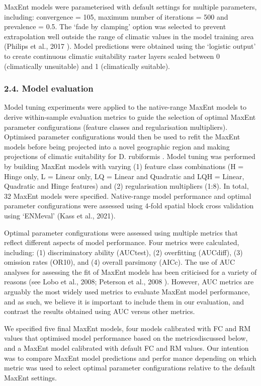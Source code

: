 \documentclass[
  authoryear,
  preprint,
  3p,
  twocolumn]{elsarticle}
\begin{document}
MaxEnt models were parameterised with default settings for multiple
parameters, including: convergence = 105, maximum number of iterations =
500 and prevalence = 0.5. The `fade by clamping' option was selected to
prevent extrapolation well outside the range of climatic values in the
model training area (Philips et al., 2017 ). Model predictions were
obtained using the `logistic output' to create continuous climatic
suitability raster layers scaled between 0 (climatically unsuitable) and
1 (climatically suitable).

\hypertarget{model-evaluation}{%
\subsubsection{2.4. Model evaluation}\label{model-evaluation}}

Model tuning experiments were applied to the native-range MaxEnt models
to derive within-sample evaluation metrics to guide the selection of
optimal MaxEnt parameter configurations (feature classes and
regularisation multipliers). Optimised parameter configurations would
then be used to refit the MaxEnt models before being projected into a
novel geographic region and making projections of climatic suitability
for D. rubiformis . Model tuning was performed by building MaxEnt models
with varying (1) feature class combinations (H = Hinge only, L = Linear
only, LQ = Linear and Quadratic and LQH = Linear, Quadratic and Hinge
features) and (2) regularisation multipliers (1:8). In total, 32 MaxEnt
models were specified. Native-range model performance and optimal
parameter configurations were assessed using 4-fold spatial block cross
validation using `ENMeval' (Kass et al., 2021).

Optimal parameter configurations were assessed using multiple metrics
that reflect different aspects of model performance. Four metrics were
calculated, including: (1) discriminatory ability (AUCtest), (2)
overfitting (AUCdiff), (3) omission rates (OR10), and (4) overall
parsimony (AICc). The use of AUC analyses for assessing the fit of
MaxEnt models has been criticised for a variety of reasons (see Lobo et
al., 2008; Peterson et al., 2008 ). However, AUC metrics are arguably
the most widely used metrics to evaluate MaxEnt model performance, and
as such, we believe it is important to include them in our evaluation,
and contrast the results obtained using AUC versus other metrics.

We specified five final MaxEnt models, four models calibrated with FC
and RM values that optimised model performance based on the
metricsdiscussed below, and a MaxEnt model calibrated with default FC
and RM values. Our intention was to compare MaxEnt model predictions and
perfor mance depending on which metric was used to select optimal
parameter configurations relative to the default MaxEnt settings.
\end{document}
